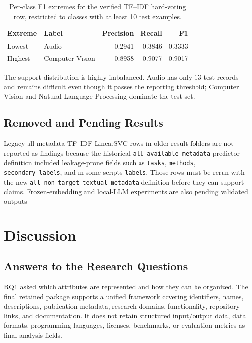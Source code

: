 \documentclass[pdflatex,sn-mathphys-num]{sn-jnl}
\theoremstyle{thmstyleone}%
\theoremstyle{thmstyletwo}%
\theoremstyle{thmstylethree}%
\begin{document}
\begin{table}[htbp]
\centering
\small
\caption{Per-class F1 extremes for the verified TF--IDF hard-voting row, restricted to classes with at least 10 test examples.}
\label{tab:per-class-extremes}
\begin{tabular}{llrrr}
\toprule
Extreme & Label & Precision & Recall & F1 \\
\midrule
Lowest & Audio & 0.2941 & 0.3846 & 0.3333 \\
Highest & Computer Vision & 0.8958 & 0.9077 & 0.9017 \\
\bottomrule
\end{tabular}
\end{table}

The support distribution is highly imbalanced. Audio has only 13 test records and remains difficult even though it passes the reporting threshold; Computer Vision and Natural Language Processing dominate the test set.

\subsection{Removed and Pending Results}
\label{subsec:removed-pending-results}

Legacy all-metadata TF--IDF LinearSVC rows in older result folders are not reported as findings because the historical \texttt{all\_available\_metadata} predictor definition included leakage-prone fields such as \texttt{tasks}, \texttt{methods}, \texttt{secondary\_labels}, and in some scripts \texttt{labels}. Those rows must be rerun with the new \texttt{all\_non\_target\_textual\_metadata} definition before they can support claims. Frozen-embedding and local-LLM experiments are also pending validated outputs.

\section{Discussion}
\label{sec:discussion}

\subsection{Answers to the Research Questions}
\label{subsec:discussion-rqs}

RQ1 asked which attributes are represented and how they can be organized. The final retained package supports a unified framework covering identifiers, names, descriptions, publication metadata, research domains, functionality, repository links, and documentation. It does not retain structured input/output data, data formats, programming languages, licenses, benchmarks, or evaluation metrics as final analysis fields.
\end{document}
